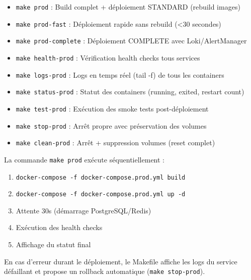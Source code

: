 \begin{itemize}
    \item \texttt{make prod} : Build complet + déploiement STANDARD (rebuild images)
    \item \texttt{make prod-fast} : Déploiement rapide sans rebuild (<30 secondes)
    \item \texttt{make prod-complete} : Déploiement COMPLETE avec Loki/AlertManager
    \item \texttt{make health-prod} : Vérification health checks tous services
    \item \texttt{make logs-prod} : Logs en temps réel (tail -f) de tous les containers
    \item \texttt{make status-prod} : Statut des containers (running, exited, restart count)
    \item \texttt{make test-prod} : Exécution des smoke tests post-déploiement
    \item \texttt{make stop-prod} : Arrêt propre avec préservation des volumes
    \item \texttt{make clean-prod} : Arrêt + suppression volumes (reset complet)
\end{itemize}

La commande \texttt{make prod} exécute séquentiellement :
\begin{enumerate}
    \item \texttt{docker-compose -f docker-compose.prod.yml build}
    \item \texttt{docker-compose -f docker-compose.prod.yml up -d}
    \item Attente 30s (démarrage PostgreSQL/Redis)
    \item Exécution des health checks
    \item Affichage du statut final
\end{enumerate}

En cas d'erreur durant le déploiement, le Makefile affiche les logs du service défaillant et propose un rollback automatique (\texttt{make stop-prod}).
